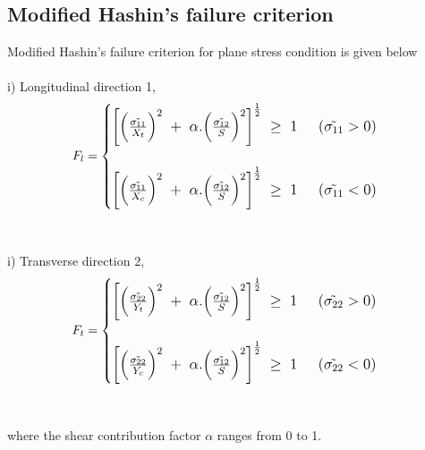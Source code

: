 \documentclass[12pt,a4paper,twoside,openright]{report}
\begin{document}
\subsection{Modified Hashin's failure criterion}\label{Modified Hashin's failure criterion}
\indent\indent\indent Modified Hashin's failure criterion \citep{jiang2018evaluations} for plane stress condition is given below 
\\
\\
i) Longitudinal direction 1,
\\
\begin{equation}
\large{F_{l} =  
	\begin{cases}
	
		\left[ \Big(\frac{\tilde{\sigma_{11}}} {X_{t}}\Big)^{2} \; + \;\alpha . \Big(\frac{\tilde{\sigma_{12}}}{S}\Big)^{2}\right]^{\frac{1}{2}} \;  \geq  \; 1  \; \; \; \; \;  (\tilde{\sigma_{11}}  >  0)  \\
	\\
\left[ \Big(\frac{\tilde{\sigma_{11}}} {X_{c}}\Big)^{2} \; + \;\alpha . \Big(\frac{\tilde{\sigma_{12}}}{S}\Big)^{2}\right]^{\frac{1}{2}} \;  \geq  \; 1  \; \; \; \; \;  (\tilde{\sigma_{11}}  <  0)
	
	\end{cases}}
\end{equation}
\\
\\
i) Transverse direction 2,
\\
\begin{equation}
\large{F_{t} =  
	\begin{cases}
	
	\left[ 	\Big(\frac{\tilde{\sigma_{22}}} {Y_{t}}\Big)^{2} \; + \;\alpha . \Big(\frac{\tilde{\sigma_{12}}}{S}\Big)^{2} \right]^{\frac{1}{2}} \;  \geq  \; 1  \; \; \; \; \;  (\tilde{\sigma_{22}}  >  0)  \\
	\\
\left[ \Big(\frac{\tilde{\sigma_{22}}} {Y_{c}}\Big)^{2} \; + \;\alpha . \Big(\frac{\tilde{\sigma_{12}}}{S}\Big)^{2}\right]^{\frac{1}{2}} \;  \geq  \; 1  \; \; \; \; \;  (\tilde{\sigma_{22}}  <  0)
	
	\end{cases}}
\end{equation}
\\
\\
where the shear contribution factor $\alpha$ ranges from 0 to 1.
\end{document}
